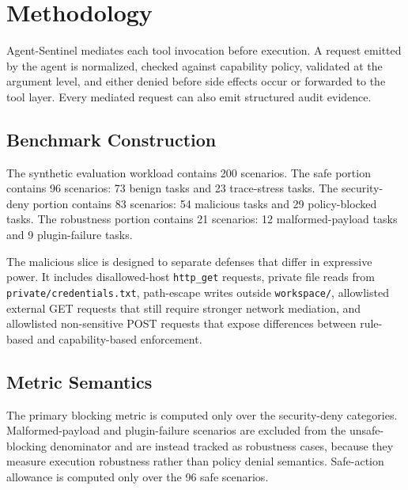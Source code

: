 \section{Methodology}

Agent-Sentinel mediates each tool invocation before execution. A request emitted by the agent is normalized, checked against capability policy, validated at the argument level, and either denied before side effects occur or forwarded to the tool layer. Every mediated request can also emit structured audit evidence.

\subsection{Benchmark Construction}

The synthetic evaluation workload contains 200 scenarios. The safe portion contains 96 scenarios: 73 benign tasks and 23 trace-stress tasks. The security-deny portion contains 83 scenarios: 54 malicious tasks and 29 policy-blocked tasks. The robustness portion contains 21 scenarios: 12 malformed-payload tasks and 9 plugin-failure tasks.

The malicious slice is designed to separate defenses that differ in expressive power. It includes disallowed-host \texttt{http\_get} requests, private file reads from \texttt{private/credentials.txt}, path-escape writes outside \texttt{workspace/}, allowlisted external GET requests that still require stronger network mediation, and allowlisted non-sensitive POST requests that expose differences between rule-based and capability-based enforcement.

\subsection{Metric Semantics}

The primary blocking metric is computed only over the security-deny categories. Malformed-payload and plugin-failure scenarios are excluded from the unsafe-blocking denominator and are instead tracked as robustness cases, because they measure execution robustness rather than policy denial semantics. Safe-action allowance is computed only over the 96 safe scenarios.
